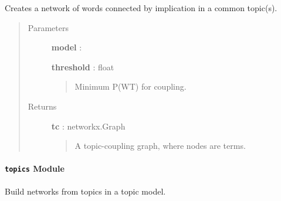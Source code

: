 \documentclass[letterpaper,10pt,english]{sphinxmanual}
\begin{document}
\begin{fulllineitems}
\label{tethne.networks:tethne.networks.terms.topic_coupling}
Creates a network of words connected by implication in a common topic(s).
\begin{quote}\begin{description}
\item[{Parameters }] \leavevmode
\textbf{model} : {\hyperref[tethne:tethne.data.LDAModel]{}}

\textbf{threshold} : float
\begin{quote}

Minimum P(W\textbar{}T) for coupling.
\end{quote}

\item[{Returns }] \leavevmode
\textbf{tc} : networkx.Graph
\begin{quote}

A topic-coupling graph, where nodes are terms.
\end{quote}

\end{description}\end{quote}

\end{fulllineitems}



\paragraph{\texttt{topics} Module}
\label{tethne.networks:topics-module}\label{tethne.networks:module-tethne.networks.topics}
Build networks from topics in a topic model.

\begin{fulllineitems}
\label{tethne.networks:tethne.networks.topics.paper_coupling}
\end{fulllineitems}


\begin{fulllineitems}
\label{tethne.networks:tethne.networks.topics.term_coupling}
\end{fulllineitems}
\end{document}
